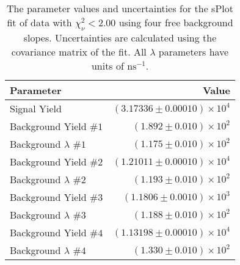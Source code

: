 
\begin{table}[ht]
    \begin{center}
        \begin{tabular}{lr}\toprule
            Parameter & Value \\\midrule
            Signal Yield & $(3.17336 \pm 0.00010) \times 10^{4}$ \\
            Background Yield $\#1$ & $(1.892 \pm 0.010) \times 10^{2}$ \\
            Background $\lambda$ $\#1$ & $(1.175 \pm 0.010) \times 10^{2}$ \\
            Background Yield $\#2$ & $(1.21011 \pm 0.00010) \times 10^{4}$ \\
            Background $\lambda$ $\#2$ & $(1.193 \pm 0.010) \times 10^{2}$ \\
            Background Yield $\#3$ & $(1.1806 \pm 0.0010) \times 10^{3}$ \\
            Background $\lambda$ $\#3$ & $(1.188 \pm 0.010) \times 10^{2}$ \\
            Background Yield $\#4$ & $(1.13198 \pm 0.00010) \times 10^{4}$ \\
            Background $\lambda$ $\#4$ & $(1.330 \pm 0.010) \times 10^{2}$ \\\bottomrule
        \end{tabular}
        \caption{The parameter values and uncertainties for the sPlot fit of data with $\chi^2_\nu < 2.00$ using four free background slopes. Uncertainties are calculated using the covariance matrix of the fit. All $\lambda$ parameters have units of $\si{\nano\second}^{-1}$.}\label{tab:splot-fit-results-chisqdof-2.00-free-4}
    \end{center}
\end{table}
